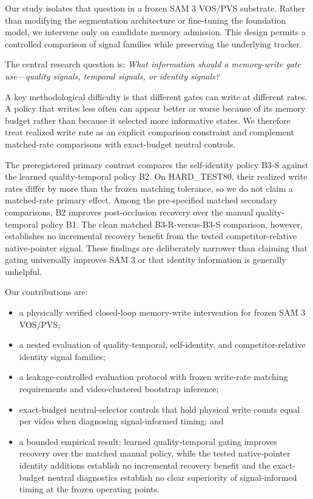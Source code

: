 \documentclass[10pt,twocolumn,letterpaper]{article}
\begin{document}
Our study isolates that question in a frozen SAM 3 VOS/PVS substrate.
Rather than modifying the segmentation architecture or fine-tuning the
foundation model, we intervene only on candidate memory admission.
This design permits a controlled comparison of signal families while
preserving the underlying tracker.

The central research question is:
\emph{What information should a memory-write gate use---quality signals,
temporal signals, or identity signals?}

A key methodological difficulty is that different gates can write at
different rates.
A policy that writes less often can appear better or worse because of its
memory budget rather than because it selected more informative states.
We therefore treat realized write rate as an explicit comparison constraint
and complement matched-rate comparisons with exact-budget neutral controls.

The preregistered primary contrast compares the self-identity policy B3-S
against the learned quality-temporal policy B2.  On HARD\_TEST80, their
realized write rates differ by more than the frozen matching tolerance, so
we do not claim a matched-rate primary effect.  Among the pre-specified
matched secondary comparisons, B2 improves post-occlusion recovery over the
manual quality-temporal policy B1.  The clean matched B3-R-versus-B3-S
comparison, however, establishes no incremental recovery benefit from the
tested competitor-relative native-pointer signal.  These findings are
deliberately narrower than claiming that gating universally improves SAM 3
or that identity information is generally unhelpful.

Our contributions are:
\begin{itemize}
    \item a physically verified closed-loop memory-write intervention for
    frozen SAM 3 VOS/PVS;
    \item a nested evaluation of quality-temporal, self-identity, and
    competitor-relative identity signal families;
    \item a leakage-controlled evaluation protocol with frozen write-rate
    matching requirements and video-clustered bootstrap inference;
    \item exact-budget neutral-selector controls that hold physical write
    counts equal per video when diagnosing signal-informed timing; and
    \item a bounded empirical result: learned quality-temporal gating
    improves recovery over the matched manual policy, while the tested
    native-pointer identity additions establish no incremental recovery
    benefit and the exact-budget neutral diagnostics establish no clear
    superiority of signal-informed timing at the frozen operating points.
\end{itemize}
\end{document}
